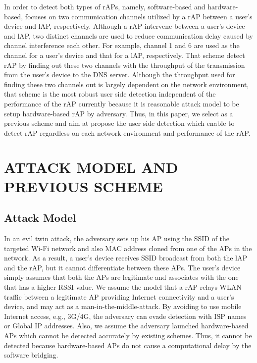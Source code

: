 \documentclass[conference]{IEEEtran}
\begin{document}
In order to detect both types of rAPs, namely, software-based and hardware-based, \cite{previous} focuses on two communication channels utilized by a rAP between a user's device and lAP, respectively.
Although a rAP intervene between a user's device and lAP, two distinct channels are used to reduce communication delay caused by channel interference each other.
For example, channel 1 and 6 are used as the channel for a user's device and that for a lAP, respectively.
That scheme detect rAP by finding out these two channels with the throughput of the transmission from the user's device to the DNS server.
Although the throughput used for finding these two channels out is largely dependent on the network environment, that scheme is the most robust user side detection independent of the performance of the rAP currently because it is reasonable attack model to be setup hardware-based rAP by adversary.
Thus, in this paper, we select \cite{previous} as a previous scheme and aim at propose the user side detection which enable to detect rAP regardless on each network environment and performance of the rAP.



\section{ATTACK MODEL AND PREVIOUS SCHEME}
\subsection{Attack Model}
In an evil twin attack, the adversary sets up his AP using the SSID of the targeted Wi-Fi network and also MAC address cloned from one of the APs in the network.
As a result, a user's device receives SSID broadcast from both the lAP and the rAP, but it cannot differentiate between these APs.
The user's device simply assumes that both the APs are legitimate and associates with the one that has a higher RSSI value.
We assume the model that a rAP relays WLAN traffic between a legitimate AP providing Internet connectivity and a user's device, and may act as a man-in-the-middle-attack.
By avoiding to use mobile Internet access, e.g., 3G/4G, the adversary can evade detection with ISP names or Global IP addresses\cite{rtt}.
Also, we assume the adversary launched hardware-based APs which cannot be detected accurately by existing schemes.
Thus, it cannot be detected because hardware-based APs do not cause a computational delay by the software bridging.
\end{document}

